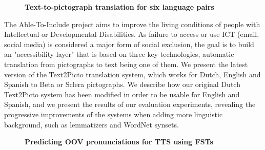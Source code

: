 \documentclass[10pt, a4paper, twopage, headinclude, footinclude, BCOR5mm]{scrartcl}
\begin{document}
\newpage

\begin{figure}[t!]
\centering
\large\textbf{Text-to-pictograph translation for six language pairs}
\vspace*{0.5cm}
\end{figure}


        \begin{table}[t!]
    \end{table}

\noindent
The Able-To-Include project aims to improve the living conditions of people with Intellectual or Developmental Disabilities. As failure to access or use ICT (email, social media) is considered a major form of social exclusion, the goal is to build an "accessibility layer" that is based on three key technologies, automatic translation from pictographs to text being one of them.   We present the latest version of the Text2Picto translation system, which works for Dutch, English and Spanish to Beta or Sclera pictographs. We describe how our original Dutch Text2Picto system has been modified in order to be usable for English and Spanish, and we present the results of our evaluation experiments, revealing the progressive improvements of the systems when adding more linguistic background, such as lemmatizers and WordNet synsets.


\newpage

\begin{figure}[t!]
\centering
\large\textbf{Predicting OOV pronunciations for TTS using FSTs}
\vspace*{0.5cm}
\end{figure}
\end{document}
